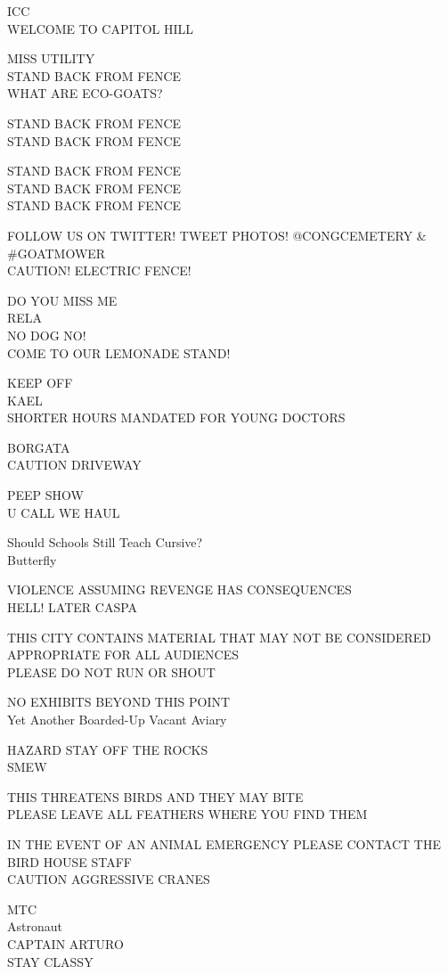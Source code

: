 \documentclass[10pt,letterpaper]{article}
\begin{document}
ICC\\
WELCOME TO CAPITOL HILL

MISS UTILITY\\
STAND BACK FROM FENCE\\
WHAT ARE ECO{-}GOATS?

STAND BACK FROM FENCE\\
STAND BACK FROM FENCE

STAND BACK FROM FENCE\\
STAND BACK FROM FENCE\\
STAND BACK FROM FENCE

FOLLOW US ON TWITTER!  TWEET PHOTOS! @CONGCEMETERY \& \#GOATMOWER\\
CAUTION!  ELECTRIC FENCE!

DO YOU MISS ME\\
RELA\\
NO DOG NO!\\
COME TO OUR LEMONADE STAND!

KEEP OFF\\
KAEL\\
SHORTER HOURS MANDATED FOR YOUNG DOCTORS

BORGATA\\
CAUTION DRIVEWAY

PEEP SHOW\\
U CALL WE HAUL

Should Schools Still Teach Cursive?\\
Butterfly

VIOLENCE ASSUMING REVENGE HAS CONSEQUENCES\\
HELL!  LATER CASPA

THIS CITY CONTAINS MATERIAL THAT MAY NOT BE CONSIDERED APPROPRIATE FOR ALL AUDIENCES\\
PLEASE DO NOT RUN OR SHOUT

NO EXHIBITS BEYOND THIS POINT\\
Yet Another Boarded{-}Up Vacant Aviary

HAZARD STAY OFF THE ROCKS\\
SMEW

THIS THREATENS BIRDS AND THEY MAY BITE\\
PLEASE LEAVE ALL FEATHERS WHERE YOU FIND THEM

IN THE EVENT OF AN ANIMAL EMERGENCY PLEASE CONTACT THE BIRD HOUSE STAFF\\
CAUTION AGGRESSIVE CRANES

MTC\\
Astronaut\\
CAPTAIN ARTURO\\
STAY CLASSY
\end{document}
